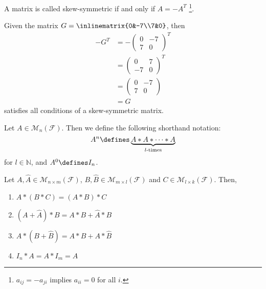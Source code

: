 \begin{definition}\label{def-skew-symmetric}
	A matrix is called skew-symmetric if and only if $A=-A^T$
	\footnote{$a_{ij}=-a_{ji}$ implies $a_{ii}=0$ for all $i$.}.
\end{definition}

\begin{exm}
	Given the matrix
	$G = \inlinematrix{0&-7\\7&0}$, then
	\begin{align*}
		-G^T & = -\begin{pmatrix}
			0 & -7 \\
			7 & 0
		\end{pmatrix}^T \\
		     & = \begin{pmatrix}
			0  & 7 \\
			-7 & 0
		\end{pmatrix}^T  \\
		     & = \begin{pmatrix}
			0 & -7 \\
			7 & 0
		\end{pmatrix}    \\
		     & = G
	\end{align*}
	satisfies all conditions of a skew-symmetric matrix.
\end{exm}

\begin{definition}\label{def-matrix-multiplication-shorthand}
	Let $A\in\mathcal{M}_{n}(\mathcal{F})$. Then we define the following
	shorthand notation:
	\begin{equation*}
		A^n\defines\underbrace{A * A * \cdots * A}_{l\textnormal{-times}}
	\end{equation*}
	for $l\in\mathbb{N}$, and $A^0\defines I_n$.
\end{definition}

\begin{lemma}\label{lemma-matrix-multiplication}
	Let $A, \hat{A}\in\mathcal{M}_{n\times m}(\mathcal{F})$,
	$B,\hat{B}\in\mathcal{M}_{m\times l}(\mathcal{F})$ and
	$C\in\mathcal{M}_{l\times k}(\mathcal{F})$. Then,
	\begin{enumerate}
		\item $A * (B * C) = (A * B) * C$               \label{lemma1-matrices:1}
		\item $(A + \hat{A}) * B = A * B + \hat{A} * B$ \label{lemma1-matrices:2}
		\item $A * (B + \hat{B}) = A * B + A * \hat{B}$ \label{lemma1-matrices:3}
		\item $I_n * A = A * I_m = A$                   \label{lemma1-matrices:4}
	\end{enumerate}
\end{lemma}

